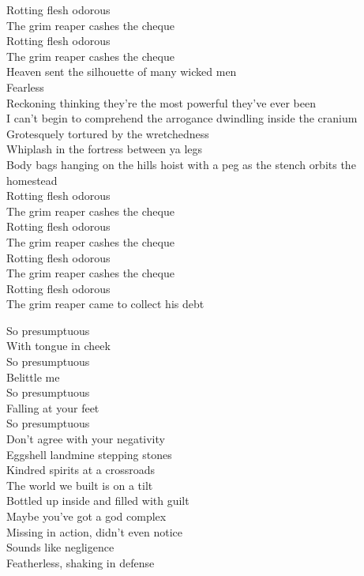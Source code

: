 Rotting flesh odorous \\
The grim reaper cashes the cheque \\
Rotting flesh odorous \\
The grim reaper cashes the cheque \\

Heaven sent the silhouette of many wicked men \\
Fearless \\
Reckoning thinking they're the most powerful they've ever been \\
I can't begin to comprehend the arrogance dwindling inside the cranium \\
Grotesquely tortured by the wretchedness \\
Whiplash in the fortress between ya legs \\
Body bags hanging on the hills hoist with a peg as the stench orbits the homestead \\

Rotting flesh odorous \\
The grim reaper cashes the cheque \\
Rotting flesh odorous \\
The grim reaper cashes the cheque \\
Rotting flesh odorous \\
The grim reaper cashes the cheque \\
Rotting flesh odorous \\
The grim reaper came to collect his debt \\




So presumptuous \\
With tongue in cheek \\
So presumptuous \\
Belittle me \\
So presumptuous \\
Falling at your feet \\
So presumptuous \\
Don't agree with your negativity \\

Eggshell landmine stepping stones \\
Kindred spirits at a crossroads \\
The world we built is on a tilt \\
Bottled up inside and filled with guilt \\
Maybe you've got a god complex \\
Missing in action, didn't even notice \\
Sounds like negligence \\
Featherless, shaking in defense \\

